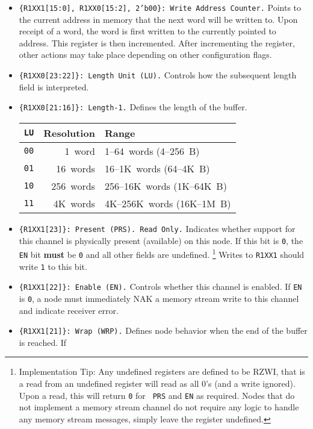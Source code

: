 \begin{itemize}
  \item {\tt \{R1XX1[15:0], R1XX0[15:2], 2'b00\}: Write Address Counter.}
    \subitem Points to the current address in memory that the next word will
    be written to. Upon receipt of a word, the word is first written to the
    currently pointed to address. This register is then incremented. After
    incrementing the register, other actions may take place depending on other
    configuration flags.
  \item {\tt \{R1XX0[23:22]\}: Length Unit (LU).}
    \subitem Controls how the subsequent length field is interpreted.
  \item {\tt \{R1XX0[21:16]\}: Length-1.}
    \subitem Defines the length of the buffer.
    \begin{tabular}{r|r|l}
      {\tt LU} & Resolution & Range \\
      \hline
      {\tt 00} & 1~word     & 1--64~words (4--256~B) \\
      {\tt 01} & 16~words   & 16--1K~words (64--4K~B) \\
      {\tt 10} & 256~words  & 256--16K~words (1K--64K~B) \\
      {\tt 11} & 4K~words   & 4K--256K~words (16K--1M~B) \\
    \end{tabular}
  \item {\tt \{R1XX1[23]\}: Present (PRS). {\color{red}Read Only.}}
    \subitem Indicates whether support for this channel is physically present
    (available) on this node. If this bit is {\tt 0}, the {\tt EN} bit {\bf
    must} be {\tt 0} and all other fields are undefined.%
    \footnote{
      Implementation Tip: Any undefined \proto registers are defined to be
      RZWI, that is a read from an undefined register will read as all 0's
      (and a write ignored). Upon a read, this will return {\tt 0} for {\tt
      PRS} and {\tt EN} as required.  Nodes that do not implement a memory
      stream channel do not require any logic to handle any memory stream
      messages, simply leave the register undefined.
    }
    Writes to {\tt R1XX1} should write {\tt 1} to this bit.
  \item {\tt \{R1XX1[22]\}: Enable (EN).}
    \subitem Controls whether this channel is enabled. If {\tt EN} is {\tt 0},
    a node must immediately NAK a memory stream write to this channel and
    indicate receiver error.
  \item {\tt \{R1XX1[21]\}: Wrap (WRP).}
    \subitem Defines node behavior when the end of the buffer is reached. If

\end{itemize}
